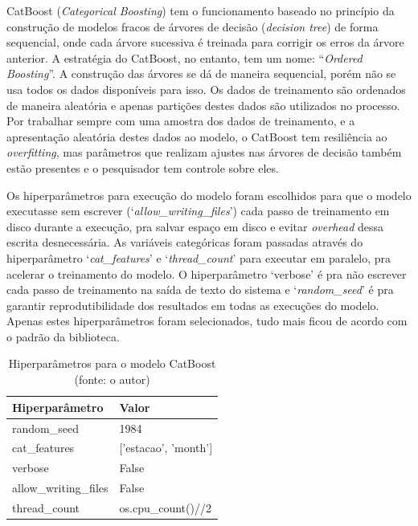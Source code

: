 CatBoost (\textit{Categorical Boosting}) tem o funcionamento baseado no princípio da construção de modelos fracos de árvores de decisão (\textit{decision tree}) de forma sequencial, onde cada árvore sucessiva é treinada para corrigir os erros da árvore anterior. A estratégia do CatBoost, no entanto, tem um nome: ``\textit{Ordered Boosting}''. A construção das árvores se dá de maneira sequencial, porém não se usa todos os dados disponíveis para isso. Os dados de treinamento são ordenados de maneira aleatória e apenas partições destes dados são utilizados no processo. Por trabalhar sempre com uma amostra dos dados de treinamento, e a apresentação aleatória destes dados ao modelo, o CatBoost tem resiliência ao \textit{overfitting}, mas parâmetros que realizam ajustes nas árvores de decisão também estão presentes e o pesquisador tem controle sobre eles.\cite{catboost_docs}\cite{dorogush2018catboost}\cite{prokhorenkova2018catboost}

Os hiperparâmetros para execução do modelo foram escolhidos para que o modelo executasse sem escrever (`\textit{allow\_writing\_files}') cada passo de treinamento em disco durante a execução, pra salvar espaço em disco e evitar \textit{overhead} dessa escrita desnecessária. As variáveis categóricas foram passadas através do hiperparâmetro `\textit{cat\_features}' e `\textit{thread\_count}' para executar em paralelo, pra acelerar o treinamento do modelo. O hiperparâmetro `verbose' é pra não escrever cada passo de treinamento na saída de texto do sistema e `\textit{random\_seed}' é pra garantir reprodutibilidade dos resultados em todas as execuções do modelo. Apenas estes hiperparâmetros foram selecionados, tudo mais ficou de acordo com o padrão da biblioteca.

\begin{table}[!h]
	\centering \small
	\caption{Hiperparâmetros para o modelo CatBoost\\(fonte: o autor)}
	\begin{tabular}{|l|l|} \hline 
		\textbf{Hiperparâmetro} & \textbf{Valor} \\\hline
		random\_seed            & 1984                 \\\hline
		cat\_features           & ['estacao', 'month'] \\\hline
		verbose                 & False                \\\hline
		allow\_writing\_files   & False                \\\hline
		thread\_count           & os.cpu\_count()//2   \\\hline
	\end{tabular}
	\label{tab:hiperparametros_catboost}
\end{table}

